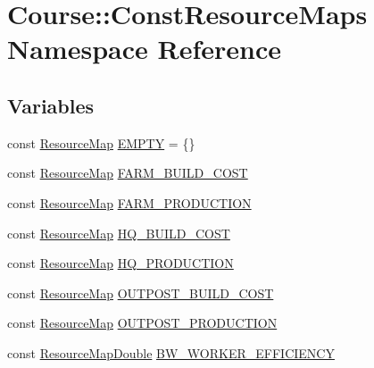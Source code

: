 \hypertarget{namespaceCourse_1_1ConstResourceMaps}{\section{Course\-:\-:Const\-Resource\-Maps Namespace Reference}
\label{namespaceCourse_1_1ConstResourceMaps}
}
\subsection*{Variables}
\begin{DoxyCompactItemize}
\item 
const \hyperlink{namespaceCourse_ab9a46ed9cd00485e318e5731ea2f78d9}{Resource\-Map} \hyperlink{namespaceCourse_1_1ConstResourceMaps_a4dc4fbb3cbb89f13a967b2101b6b6a17}{E\-M\-P\-T\-Y} = \{\}
\item 
const \hyperlink{namespaceCourse_ab9a46ed9cd00485e318e5731ea2f78d9}{Resource\-Map} \hyperlink{namespaceCourse_1_1ConstResourceMaps_a4919571a8aa47de7c6e513de147642ef}{F\-A\-R\-M\-\_\-\-B\-U\-I\-L\-D\-\_\-\-C\-O\-S\-T}
\item 
const \hyperlink{namespaceCourse_ab9a46ed9cd00485e318e5731ea2f78d9}{Resource\-Map} \hyperlink{namespaceCourse_1_1ConstResourceMaps_ac05142db09e7f1f85c7d936356a35df2}{F\-A\-R\-M\-\_\-\-P\-R\-O\-D\-U\-C\-T\-I\-O\-N}
\item 
const \hyperlink{namespaceCourse_ab9a46ed9cd00485e318e5731ea2f78d9}{Resource\-Map} \hyperlink{namespaceCourse_1_1ConstResourceMaps_a629a12b3f9357cd851c54f2126d22502}{H\-Q\-\_\-\-B\-U\-I\-L\-D\-\_\-\-C\-O\-S\-T}
\item 
const \hyperlink{namespaceCourse_ab9a46ed9cd00485e318e5731ea2f78d9}{Resource\-Map} \hyperlink{namespaceCourse_1_1ConstResourceMaps_aabaaa4f78c30eed6e966b596423c8dea}{H\-Q\-\_\-\-P\-R\-O\-D\-U\-C\-T\-I\-O\-N}
\item 
const \hyperlink{namespaceCourse_ab9a46ed9cd00485e318e5731ea2f78d9}{Resource\-Map} \hyperlink{namespaceCourse_1_1ConstResourceMaps_a0baa840c24b118a34043afeb268c4408}{O\-U\-T\-P\-O\-S\-T\-\_\-\-B\-U\-I\-L\-D\-\_\-\-C\-O\-S\-T}
\item 
const \hyperlink{namespaceCourse_ab9a46ed9cd00485e318e5731ea2f78d9}{Resource\-Map} \hyperlink{namespaceCourse_1_1ConstResourceMaps_ae91bf6e7a36ca76016f6d149e94a3e9d}{O\-U\-T\-P\-O\-S\-T\-\_\-\-P\-R\-O\-D\-U\-C\-T\-I\-O\-N}
\item 
const \hyperlink{namespaceCourse_a0b96bae1a664dde34efbb1b42dea615e}{Resource\-Map\-Double} \hyperlink{namespaceCourse_1_1ConstResourceMaps_a895601aa763ac51bf37a0f640eb36c08}{B\-W\-\_\-\-W\-O\-R\-K\-E\-R\-\_\-\-E\-F\-F\-I\-C\-I\-E\-N\-C\-Y}

\end{DoxyCompactItemize}
